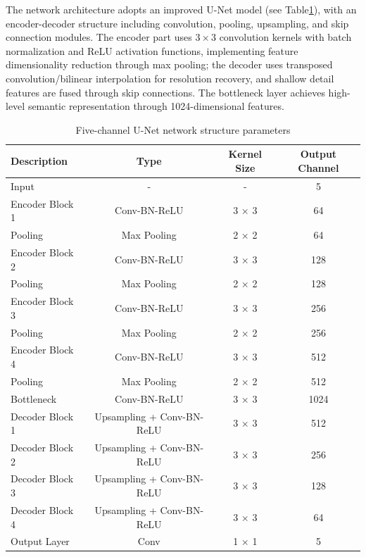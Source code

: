 \documentclass[
reprint,
superscriptaddress,
nofootinbib,
amsmath,amssymb,
aps,
prd,
]{revtex4-2}
\begin{document}

The network architecture adopts an improved U-Net model (see Table\ref{tab:unet_architecture}), with an encoder-decoder structure including convolution, pooling, upsampling, and skip connection modules. The encoder part uses $3\times3$ convolution kernels with batch normalization and ReLU activation functions, implementing feature dimensionality reduction through max pooling; the decoder uses transposed convolution/bilinear interpolation for resolution recovery, and shallow detail features are fused through skip connections. The bottleneck layer achieves high-level semantic representation through 1024-dimensional features.

\begin{table}[htbp]
    \centering
    \caption{Five-channel U-Net network structure parameters}
    \label{tab:unet_architecture}
    \begin{tabular}{@{}lccc@{}}
    \toprule
    \textbf{Description} & \textbf{Type} & \textbf{Kernel Size} & \textbf{Output Channel} \\ \midrule
    Input & - & - & 5 \\
    Encoder Block 1 & Conv-BN-ReLU & 3 × 3 & 64 \\
    Pooling & Max Pooling & 2 × 2 & 64 \\
    Encoder Block 2 & Conv-BN-ReLU & 3 × 3 & 128 \\
    Pooling & Max Pooling & 2 × 2 & 128 \\
    Encoder Block 3 & Conv-BN-ReLU & 3 × 3 & 256 \\
    Pooling & Max Pooling & 2 × 2 & 256 \\
    Encoder Block 4 & Conv-BN-ReLU & 3 × 3 & 512 \\
    Pooling & Max Pooling & 2 × 2 & 512 \\
    Bottleneck & Conv-BN-ReLU & 3 × 3 & 1024 \\
    Decoder Block 1 & Upsampling + Conv-BN-ReLU & 3 × 3 & 512 \\
    Decoder Block 2 & Upsampling + Conv-BN-ReLU & 3 × 3 & 256 \\
    Decoder Block 3 & Upsampling + Conv-BN-ReLU & 3 × 3 & 128 \\
    Decoder Block 4 & Upsampling + Conv-BN-ReLU & 3 × 3 & 64 \\
    Output Layer & Conv & 1 × 1 & 5 \\ \bottomrule
    \end{tabular}
\end{table}
\end{document}
